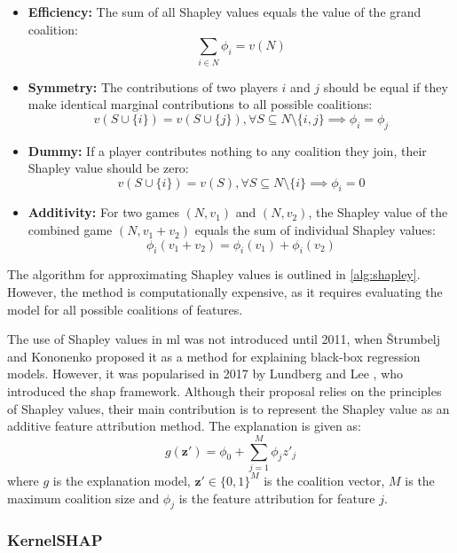 \begin{itemize}
    \item \textbf{Efficiency:} The sum of all Shapley values equals the value of the grand coalition:
    \[
        \sum_{i \in N} \phi_i = v(N)
    \]
    \item \textbf{Symmetry:} The contributions of two players $i$ and $j$ should be equal if they make identical marginal contributions to all possible coalitions:
    \[
        v(S \cup \{i\}) = v(S \cup \{j\}), \forall S \subseteq N \setminus \{i, j\} \implies \phi_i = \phi_j
    \]
    \item \textbf{Dummy:} If a player contributes nothing to any coalition they join, their Shapley value should be zero:
    \[
        v(S \cup \{i\}) = v(S), \forall S \subseteq N \setminus \{i\} \implies \phi_i = 0
    \]
    \item \textbf{Additivity:} For two games $(N,v_1)$ and $(N,v_2)$, the Shapley value of the combined game $(N,v_1+v_2)$ equals the sum of individual Shapley values:
    \[
        \phi_i(v_1 + v_2) = \phi_i(v_1) + \phi_i(v_2)
    \]
\end{itemize}

The algorithm for approximating Shapley values is outlined in \ref{alg:shapley}. However, the method is computationally expensive, as it requires evaluating the model for all possible coalitions of features.

The use of Shapley values in \acrshort{ml} was not introduced until 2011, when Štrumbelj and Kononenko \cite{Strumbelj2011} proposed it as a method for explaining black-box regression models. However, it was popularised in 2017 by Lundberg and Lee \cite{Lundberg2017}, who introduced the \acrshort{shap} framework. Although their proposal relies on the principles of Shapley values, their main contribution is to represent the Shapley value as an additive feature attribution method. The explanation is given as:
\begin{equation}
    g(\mathbf{z}') = \phi_0 + \sum_{j=1}^{M} \phi_j z'_j
\end{equation}
where $g$ is the explanation model, $\mathbf{z}' \in \{0,1\}^M$ is the coalition vector, $M$ is the maximum coalition size and $\phi_j$ is the feature attribution for feature $j$.

\subsubsection{KernelSHAP} \label{sec:kernelshap}

